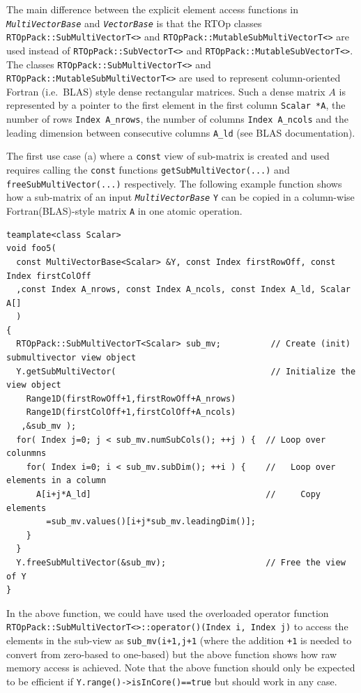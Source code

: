 \documentclass[pdf,ps2pdf,11pt]{SANDreport}
\begin{document}
The main difference between the explicit element access functions in
{}\texttt{\textit{Multi\-Vector\-Base}} and {}\texttt{\textit{Vector\-Base}} is
that the RTOp classes {}\texttt{RTOpPack::\-Sub\-Multi\-Vector\-T<>}
and {}\texttt{RTOpPack::\-Mutable\-Sub\-Multi\-Vector\-T<>} are used
instead of {}\texttt{RTOpPack::\-Sub\-Vector\-T<>} and
{}\texttt{RTOpPack::\-Mutable\-Sub\-Vector\-T<>}.  The classes
{}\texttt{RTOpPack::\-Sub\-Multi\-Vector\-T<>} and
{}\texttt{RTOpPack::\-Mutable\-Sub\-Multi\-Vector\-T<>} are used to
represent column-oriented Fortran (i.e.~BLAS) style dense rectangular
matrices.  Such a dense matrix $A$ is represented by a pointer to the
first element in the first column {}\texttt{Scalar *A}, the number of
rows {}\texttt{Index A\_nrows}, the number of columns {}\texttt{Index
A\_ncols} and the leading dimension between consecutive columns
{}\texttt{A\_ld} (see BLAS documentation).

The first use case (a) where a {}\texttt{const} view of sub-matrix is
created and used requires calling the {}\texttt{const} functions
{}\texttt{get\-Sub\-Multi\-Vector(...)} and
{}\texttt{free\-Sub\-Multi\-Vector(...)}  respectively.  The following
example function shows how a sub-matrix of an input
{}\texttt{\textit{Multi\-Vector\-Base}} {}\texttt{Y} can be copied in a
column-wise Fortran(BLAS)-style matrix {}\texttt{A} in one atomic
operation.

{\scriptsize\begin{verbatim}
teamplate<class Scalar>
void foo5(
  const MultiVectorBase<Scalar> &Y, const Index firstRowOff, const Index firstColOff
  ,const Index A_nrows, const Index A_ncols, const Index A_ld, Scalar A[]
  )
{
  RTOpPack::SubMultiVectorT<Scalar> sub_mv;          // Create (init) submultivector view object
  Y.getSubMultiVector(                               // Initialize the view object
    Range1D(firstRowOff+1,firstRowOff+A_nrows)
    Range1D(firstColOff+1,firstColOff+A_ncols)
   ,&sub_mv );
  for( Index j=0; j < sub_mv.numSubCols(); ++j ) {  // Loop over colunmns
    for( Index i=0; i < sub_mv.subDim(); ++i ) {    //   Loop over elements in a column
      A[i+j*A_ld]                                   //     Copy elements
        =sub_mv.values()[i+j*sub_mv.leadingDim()];
    }
  }
  Y.freeSubMultiVector(&sub_mv);                    // Free the view of Y
}
\end{verbatim}}

In the above function, we could have used the overloaded operator
function
{}\texttt{RTOpPack::\-Sub\-Multi\-VectorT<>::\-operator()(Index i,
Index j)} to access the elements in the sub-view as
{}\texttt{sub\_mv(i+1,j+1} (where the addition {}\texttt{+1} is needed
to convert from zero-based to one-based) but the above function shows
how raw memory access is achieved.  Note that the above function
should only be expected to be efficient if
{}\texttt{Y.range()->isInCore()==true} but should work in any case.
\end{document}
